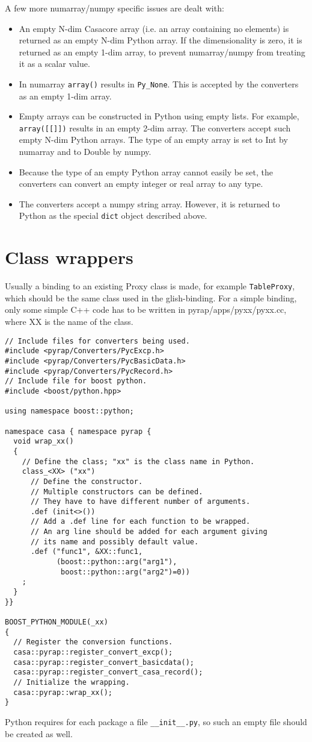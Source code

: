 A few more numarray/numpy specific issues are dealt with:
\begin{itemize}
\item An empty N-dim Casacore array (i.e. an array containing no elements) is
returned as an empty N-dim Python array. If the dimensionality is
zero, it is returned as an empty 1-dim array, to prevent numarray/numpy
from treating it as a scalar value.
\item In numarray \texttt{array()} results in \texttt{Py\_None}. This
is accepted by the converters as an empty 1-dim array.
\item Empty arrays can be constructed in Python using empty lists. For
example, \texttt{array([[]])} results in an empty 2-dim array. The
converters accept such empty N-dim Python arrays. The type of an empty
array is set to Int by numarray and to Double by numpy.
\item Because the type of an empty Python array cannot easily be set,
the converters can convert an empty integer or real array to any type.
\item The converters accept a numpy string array. However, it is
returned to Python as the special \texttt{dict} object described above.
\end{itemize}

\section{Class wrappers}
Usually a binding to an existing Proxy class is made, for example
\texttt{TableProxy}, which should be the same class used in the
glish-binding. 
For a simple binding, only some simple C++ code has to be written in
pyrap/apps/pyxx/pyxx.cc, where XX is the name of the class.
\begin{verbatim}
// Include files for converters being used.
#include <pyrap/Converters/PycExcp.h>
#include <pyrap/Converters/PycBasicData.h>
#include <pyrap/Converters/PycRecord.h>
// Include file for boost python.
#include <boost/python.hpp>

using namespace boost::python;

namespace casa { namespace pyrap {
  void wrap_xx()
  {
    // Define the class; "xx" is the class name in Python.
    class_<XX> ("xx")
      // Define the constructor.
      // Multiple constructors can be defined.
      // They have to have different number of arguments.
      .def (init<>())
      // Add a .def line for each function to be wrapped.
      // An arg line should be added for each argument giving
      // its name and possibly default value.
      .def ("func1", &XX::func1,
            (boost::python::arg("arg1"),
             boost::python::arg("arg2")=0))
    ;
  }
}}

BOOST_PYTHON_MODULE(_xx)
{
  // Register the conversion functions.
  casa::pyrap::register_convert_excp();
  casa::pyrap::register_convert_basicdata();
  casa::pyrap::register_convert_casa_record();
  // Initialize the wrapping.
  casa::pyrap::wrap_xx();
}
\end{verbatim}
Python requires for each package a file \texttt{\_\_init\_\_.py},
so such an empty file should be created as well.

